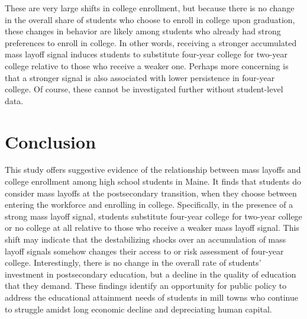 \documentclass[12pt,letterpaper]{article}
\begin{document}
These are very large shifts in college enrollment, but because there is no change in the overall share of students who choose to enroll in college upon graduation, these changes in behavior are likely among students who already had strong preferences to enroll in college. In other words, receiving a stronger accumulated mass layoff signal induces students to substitute four-year college for two-year college relative to those who receive a weaker one. Perhaps more concerning is that a stronger signal is also associated with lower persistence in four-year college. Of course, these cannot be investigated further without student-level data.

\section{Conclusion}

This study offers suggestive evidence of the relationship between mass layoffs and college enrollment among high school students in Maine. It finds that students do consider mass layoffs at the postsecondary transition, when they choose between entering the workforce and enrolling in college. Specifically, in the presence of a strong mass layoff signal, students substitute four-year college for two-year college or no college at all relative to those who receive a weaker mass layoff signal. This shift may indicate that the destabilizing shocks over an accumulation of mass layoff signals somehow changes their access to or risk assessment of four-year college. Interestingly, there is no change in the overall rate of students' investment in postsecondary education, but a decline in the quality of education that they demand. These findings identify an opportunity for public policy to address the educational attainment needs of students in mill towns who continue to struggle amidst long economic decline and depreciating human capital.



\end{document}
